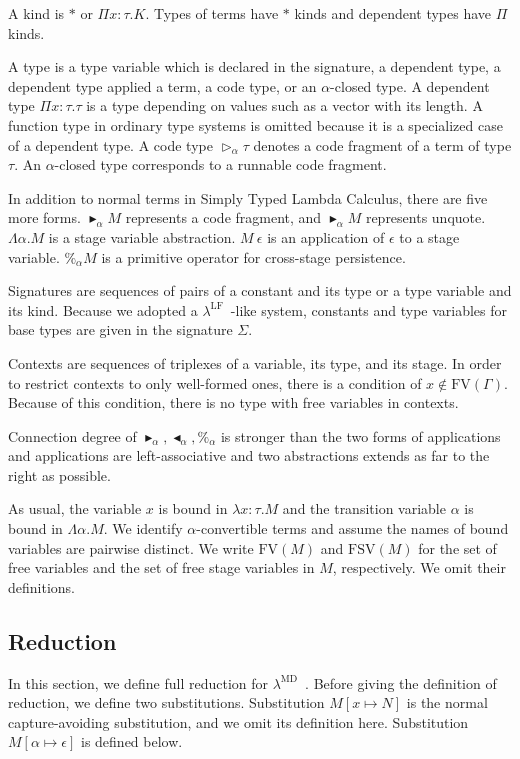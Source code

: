 \documentclass[runningheads]{llncs}
\newcommand{\LMD}{$\lambda^{\textrm{MD}}$\ }
\newcommand{\LLF}{$\lambda^{\textrm{LF}}$\ }
\newcommand{\G}{\Gamma}
\newcommand{\TW}{\triangleright}
\newcommand{\TB}{\blacktriangleright}
\newcommand{\TBL}{\blacktriangleleft}
\newcommand{\FV}{\text{FV}}
\newcommand{\FTV}{\text{FSV}}
\begin{document}
A kind is $*$ or $\Pi x:\tau.K$. Types of terms have $*$ kinds and dependent types have $\Pi$ kinds.

A type is a type variable which is declared in the signature, a dependent type, a dependent type applied a term, a code type, or an $\alpha$-closed type.
A dependent type $\Pi x:\tau.\tau$ is a type depending on values such as a vector with its length.
A function type in ordinary type systems is omitted because it is a specialized case of a dependent type.
A code type $\TW_\alpha \tau$ denotes a code fragment of a term of type $\tau$.
An $\alpha$-closed type corresponds to a runnable code fragment.

In addition to normal terms in Simply Typed Lambda Calculus, there are five more forms.
$\TB_\alpha M$ represents a code fragment, and $\TB_\alpha M$ represents unquote.
$\Lambda\alpha.M$ is a stage variable abstraction.
$M\ \epsilon$ is an application of $\epsilon$ to a stage variable.
$\%_\alpha M$ is a primitive operator for cross-stage persistence.

Signatures are sequences of pairs of a constant and its type or a type variable and its kind.
Because we adopted a \LLF-like system, constants and type variables for base types are given in the signature $\Sigma$.

Contexts are sequences of triplexes of a variable, its type, and its stage.
In order to restrict contexts to only well-formed ones, there is a condition of $x\notin\FV(\G)$.
Because of this condition, there is no type with free variables in contexts.

Connection degree of $\TB_\alpha, \TBL_\alpha, \%_\alpha$ is stronger than the two forms of applications
and applications are left-associative
and two abstractions extends as far to the right as possible.

As usual, the variable $x$ is bound in $\lambda x:\tau.M$
and the transition variable $\alpha$ is bound in $\Lambda \alpha.M$.
We identify $\alpha$-convertible terms and assume the names of bound variables are pairwise distinct.
We write $\FV(M)$ and $\FTV(M)$ for the set of free variables and the set of free stage variables in $M$, respectively.
We omit their definitions.

\subsection{Reduction}

In this section, we define full reduction for \LMD.
Before giving the definition of reduction, we define two substitutions.
Substitution $M[x\mapsto N]$ is the normal capture-avoiding substitution, and we omit its definition here.
Substitution $M[\alpha \mapsto \epsilon]$ is defined below.
\end{document}
